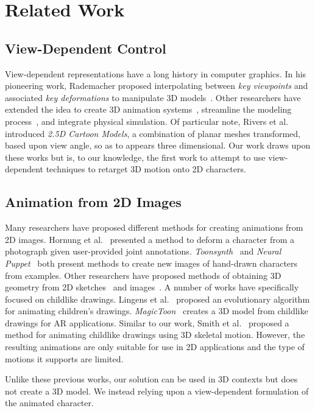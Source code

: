 \section{Related Work}
\subsection{View-Dependent Control}
View-dependent representations have a long history in computer graphics.
In his pioneering work, Rademacher proposed interpolating between \textit{key viewpoints} and associated \textit{key deformations} to manipulate 3D models~\cite{rademacher1999view}.
Other researchers have extended the idea to create 3D animation systems~\cite{10.1111:j.1467-8659.2004.00772.x}, streamline the modeling process~\cite{DBLP:journals/corr/abs-2103-15472}, and integrate physical simulation\cite{koyama2013view}.
Of particular note, Rivers et al.~\cite{rivers25Dcartoonmodels} introduced \textit{2.5D Cartoon Models}, a combination of planar meshes transformed, based upon view angle, so as to appears three dimensional.
Our work draws upon these works but is, to our knowledge, the first work to attempt to use view-dependent techniques to retarget 3D motion onto 2D characters.   

\subsection{Animation from 2D Images}

Many researchers have proposed different methods for creating animations from 2D images. Hornung et al.~\cite{Hornung2007anim2Dpicmotion} presented a method to deform a character from a photograph given user-provided joint annotations.
\textit{Toonsynth}~\cite{Dvoroznak18-SIG} and \textit{Neural Puppet}~\cite{poursaeed2020neural} both present methods to create new images of hand-drawn characters from examples.
Other researchers have proposed methods of obtaining 3D geometry from 2D sketches~\cite{igarashi2006teddy, Dvoroznak20-SA} and images~\cite{ArtiSketch,weng2019photo}.
A number of works have specifically focused on childlike drawings.
Lingens et al.~\cite{lingens2020towards} proposed an evolutionary algorithm for animating children's drawings. 
\textit{MagicToon}~\cite{feng2017magictoon} creates a 3D model from childlike drawings for AR applications.
Similar to our work, Smith et al.~\cite{SmithHodgins} proposed a method for animating childlike drawings using 3D skeletal motion. 
However, the resulting animations are only suitable for use in 2D applications and the type of motions it supports are limited.

Unlike these previous works, our solution can be used in 3D contexts but does not create a 3D model. We instead relying upon a view-dependent formulation of the animated character.